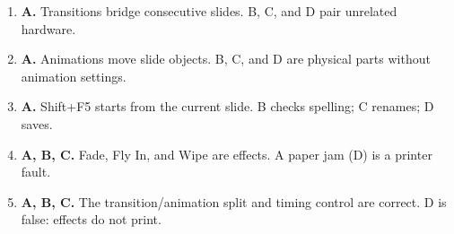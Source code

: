 \documentclass[11pt]{article}
\begin{document}
\begin{enumerate}[label=\textbf{Q\arabic*.}, leftmargin=*]
\item \textbf{A.} Transitions bridge consecutive slides. B, C, and D pair unrelated hardware.
\item \textbf{A.} Animations move slide objects. B, C, and D are physical parts without animation settings.
\item \textbf{A.} Shift+F5 starts from the current slide. B checks spelling; C renames; D saves.
\item \textbf{A, B, C.} Fade, Fly In, and Wipe are effects. A paper jam (D) is a printer fault.
\item \textbf{A, B, C.} The transition/animation split and timing control are correct. D is false: effects do not print.
\end{enumerate}
\def\JKSSBLessonID{32}\def\JKSSBAnswers{1}
\end{document}
